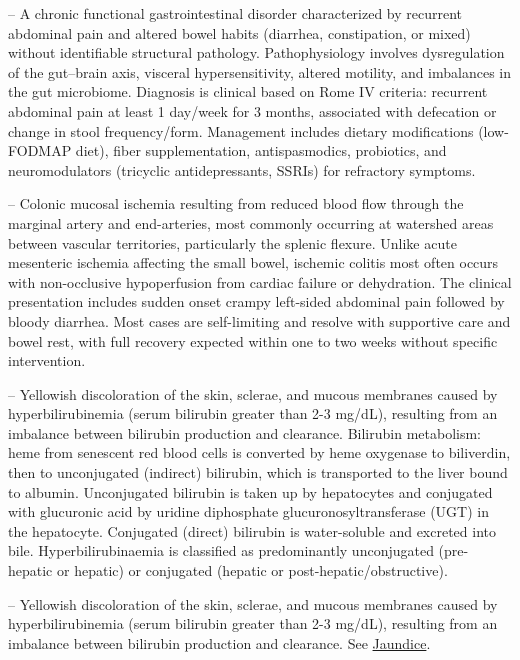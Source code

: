 -- A chronic functional gastrointestinal disorder characterized by recurrent abdominal pain and altered bowel habits (diarrhea, constipation, or mixed) without identifiable structural pathology. Pathophysiology involves dysregulation of the gut--brain axis, visceral hypersensitivity, altered motility, and imbalances in the gut microbiome. Diagnosis is clinical based on Rome IV criteria: recurrent abdominal pain at least 1 day/week for 3 months, associated with defecation or change in stool frequency/form. Management includes dietary modifications (low-FODMAP diet), fiber supplementation, antispasmodics, probiotics, and neuromodulators (tricyclic antidepressants, SSRIs) for refractory symptoms.

-- Colonic mucosal ischemia resulting from reduced blood flow through the marginal artery and end-arteries, most commonly occurring at watershed areas between vascular territories, particularly the splenic flexure. Unlike acute mesenteric ischemia affecting the small bowel, ischemic colitis most often occurs with non-occlusive hypoperfusion from cardiac failure or dehydration. The clinical presentation includes sudden onset crampy left-sided abdominal pain followed by bloody diarrhea. Most cases are self-limiting and resolve with supportive care and bowel rest, with full recovery expected within one to two weeks without specific intervention.

-- Yellowish discoloration of the skin, sclerae, and mucous membranes caused by hyperbilirubinemia (serum bilirubin greater than 2-3 mg/dL), resulting from an imbalance between bilirubin production and clearance. Bilirubin metabolism: heme from senescent red blood cells is converted by heme oxygenase to biliverdin, then to unconjugated (indirect) bilirubin, which is transported to the liver bound to albumin. Unconjugated bilirubin is taken up by hepatocytes and conjugated with glucuronic acid by uridine diphosphate glucuronosyltransferase (UGT) in the hepatocyte. Conjugated (direct) bilirubin is water-soluble and excreted into bile. Hyperbilirubinaemia is classified as predominantly unconjugated (pre-hepatic or hepatic) or conjugated (hepatic or post-hepatic/obstructive).

-- Yellowish discoloration of the skin, sclerae, and mucous membranes caused by hyperbilirubinemia (serum bilirubin greater than 2-3 mg/dL), resulting from an imbalance between bilirubin production and clearance. See \hyperlink{Jaundice}{Jaundice}.

